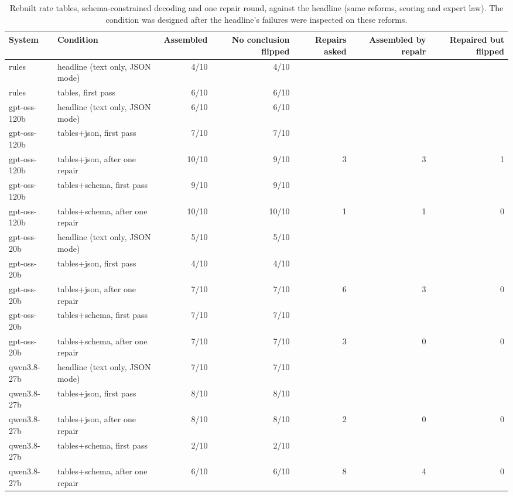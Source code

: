 \begin{table}[t]
\centering\small
\caption{Rebuilt rate tables, schema-constrained decoding and one repair round, against the headline (same reforms, scoring and expert law). The condition was designed after the headline's failures were inspected on these reforms.}
\label{tab:structured}
\begin{tabular}{llrrrrr}
\toprule
System & Condition & Assembled & No conclusion flipped & Repairs asked & Assembled by repair & Repaired but flipped \\
\midrule
rules & headline (text only, JSON mode) & 4/10 & 4/10 &  &  &  \\
rules & tables, first pass & 6/10 & 6/10 &  &  &  \\
gpt-oss-120b & headline (text only, JSON mode) & 6/10 & 6/10 &  &  &  \\
gpt-oss-120b & tables+json, first pass & 7/10 & 7/10 &  &  &  \\
gpt-oss-120b & tables+json, after one repair & 10/10 & 9/10 & 3 & 3 & 1 \\
gpt-oss-120b & tables+schema, first pass & 9/10 & 9/10 &  &  &  \\
gpt-oss-120b & tables+schema, after one repair & 10/10 & 10/10 & 1 & 1 & 0 \\
gpt-oss-20b & headline (text only, JSON mode) & 5/10 & 5/10 &  &  &  \\
gpt-oss-20b & tables+json, first pass & 4/10 & 4/10 &  &  &  \\
gpt-oss-20b & tables+json, after one repair & 7/10 & 7/10 & 6 & 3 & 0 \\
gpt-oss-20b & tables+schema, first pass & 7/10 & 7/10 &  &  &  \\
gpt-oss-20b & tables+schema, after one repair & 7/10 & 7/10 & 3 & 0 & 0 \\
qwen3.8-27b & headline (text only, JSON mode) & 7/10 & 7/10 &  &  &  \\
qwen3.8-27b & tables+json, first pass & 8/10 & 8/10 &  &  &  \\
qwen3.8-27b & tables+json, after one repair & 8/10 & 8/10 & 2 & 0 & 0 \\
qwen3.8-27b & tables+schema, first pass & 2/10 & 2/10 &  &  &  \\
qwen3.8-27b & tables+schema, after one repair & 6/10 & 6/10 & 8 & 4 & 0 \\
\bottomrule
\end{tabular}
\end{table}
